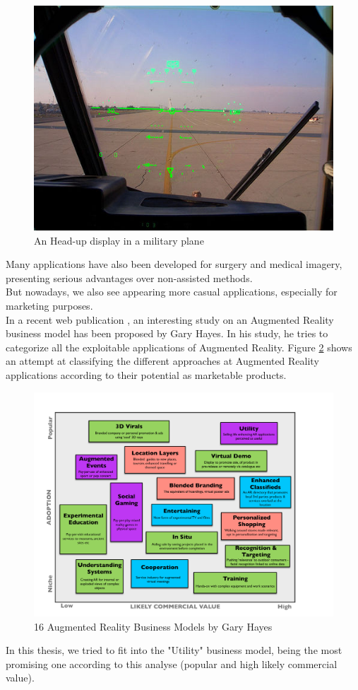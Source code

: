 \begin{figure}[ht]
\center
\includegraphics[scale=0.6]{pics/headup_display}
\caption{An Head-up display in a military plane \cite{headupsource}}
\label{fig:headup_display}
\end{figure}

Many applications have also been developed for surgery and medical imagery, presenting serious advantages over non-assisted methods.\\

But nowadays, we also see appearing more casual applications, especially for marketing purposes.\\

In a recent web publication \cite{Hay09}, an interesting study on an Augmented Reality business model has been proposed by Gary Hayes. In his study, he tries to categorize all the exploitable applications of Augmented Reality. Figure \ref{fig:AR_business_model} shows an attempt at classifying the different approaches at Augmented Reality applications according to their potential as marketable products.\\

\begin{figure}[ht]
\center
\includegraphics[scale=0.4]{pics/AR_business_model}
\caption{16 Augmented Reality Business Models by Gary Hayes \cite{Hay09}}
\label{fig:AR_business_model}
\end{figure}

In this thesis, we tried to fit into the "Utility" business model, being the most promising one according to this analyse (popular and high likely commercial value).\\

